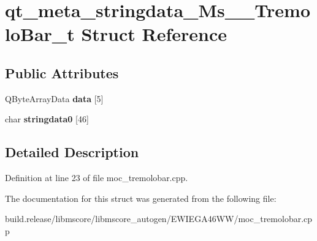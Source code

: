 \hypertarget{structqt__meta__stringdata___ms_____tremolo_bar__t}{}\section{qt\+\_\+meta\+\_\+stringdata\+\_\+\+Ms\+\_\+\+\_\+\+Tremolo\+Bar\+\_\+t Struct Reference}
\label{structqt__meta__stringdata___ms_____tremolo_bar__t}
\subsection*{Public Attributes}
\begin{DoxyCompactItemize}
\item 
\mbox{\label{structqt__meta__stringdata___ms_____tremolo_bar__t_a4e9693d1fc9ac0fe03aba36561b801da}} 
Q\+Byte\+Array\+Data {\bfseries data} \mbox{[}5\mbox{]}
\item 
\mbox{\label{structqt__meta__stringdata___ms_____tremolo_bar__t_a139ab0323cf6cce7d8c82aee5869d4b2}} 
char {\bfseries stringdata0} \mbox{[}46\mbox{]}
\end{DoxyCompactItemize}


\subsection{Detailed Description}


Definition at line 23 of file moc\+\_\+tremolobar.\+cpp.



The documentation for this struct was generated from the following file\+:\begin{DoxyCompactItemize}
\item 
build.\+release/libmscore/libmscore\+\_\+autogen/\+E\+W\+I\+E\+G\+A46\+W\+W/moc\+\_\+tremolobar.\+cpp\end{DoxyCompactItemize}
